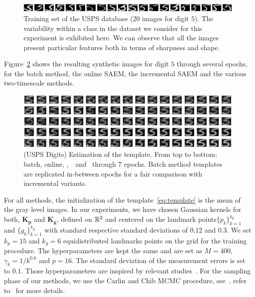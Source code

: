 \documentclass[bj]{imsart}
\numberwithin{equation}{section}
\theoremstyle{plain}
\begin{document}
\vspace{0.2in}
\begin{figure}[H]
\includegraphics[width=\textwidth]{fig/variancedigit.png}
\caption{Training set of the USPS database (20 images for digit $5$). The variability within a class in the dataset we consider for this experiment is exhibited here. We can observe that all the images present particular features both in terms of sharpness and shape.}
\label{fig:variancedigit}
\end{figure}



Figure~\ref{fig:results} shows the resulting synthetic images for digit $5$ through several epochs, for the batch method, the online SAEM, the incremental SAEM and the various two-timescale methods.



\begin{figure}[t]
\includegraphics[width=\textwidth]{fig/deformable3}
\caption{(USPS Digits) Estimation of the template. From top to bottom: batch, online, \ISAEM,\ \SAEMVR\ and \FISAEM\ through 7 epochs. Batch method templates are replicated in-between epochs for a fair comparison with incremental variants. }
\label{fig:results}
\end{figure}


For all methods, the initialization of the template~\eqref{eq:template} is the mean of the gray level images.
In our experiments, we have chosen Gaussian kernels for both, $\mathbf{K}_{\mathbf{p}}$ and $\mathbf{K}_{\mathbf{g}}$, defined on $\rset^2$ and centered on the landmark points$\{p_k\}_{k=1}^{k_p}$ and $\{g_k\}_{k=1}^{k_g}$ with standard respective standard deviations of $0.12$ and $0.3$. 
We set $k_p = 15$  and  $k_g = 6$ equidistributed landmarks points on the grid for the training procedure. 
The hyperparameters are kept the same and are set as $M = 400$, $ \gamma_k = 1/k^{0.6}$ and $ p = 16$.
The standard deviation of the measurement errors is set to $0.1$.
Those hyperparameters are inspired by relevant studies~\citep{allassonniere2010construction,allassonniere2013statistical}.
For the sampling phase of our methods, we use the Carlin and Chib MCMC procedure, see~\citet{carlin1995bayesian}, refer to~\citet{maire2016online} for more details.
\end{document}
